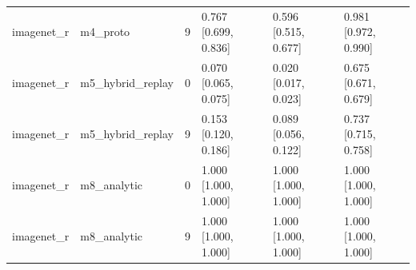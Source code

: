 \begin{tabular}{llrlll}
imagenet\_r & m4\_proto & 9 & 0.767 [0.699, 0.836] & 0.596 [0.515, 0.677] & 0.981 [0.972, 0.990] \\
imagenet\_r & m5\_hybrid\_replay & 0 & 0.070 [0.065, 0.075] & 0.020 [0.017, 0.023] & 0.675 [0.671, 0.679] \\
imagenet\_r & m5\_hybrid\_replay & 9 & 0.153 [0.120, 0.186] & 0.089 [0.056, 0.122] & 0.737 [0.715, 0.758] \\
imagenet\_r & m8\_analytic & 0 & 1.000 [1.000, 1.000] & 1.000 [1.000, 1.000] & 1.000 [1.000, 1.000] \\
imagenet\_r & m8\_analytic & 9 & 1.000 [1.000, 1.000] & 1.000 [1.000, 1.000] & 1.000 [1.000, 1.000] \\
\bottomrule
\end{tabular}
